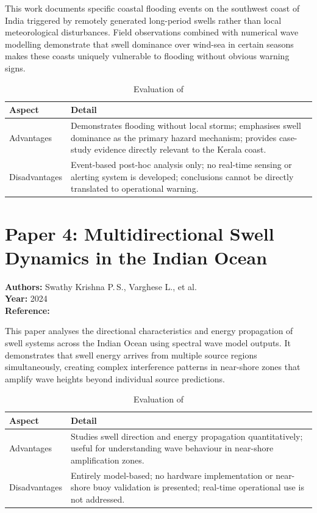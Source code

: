 This work documents specific coastal flooding events on the southwest coast of India
triggered by remotely generated long-period swells rather than local meteorological
disturbances.
Field observations combined with numerical wave modelling demonstrate that swell
dominance over wind-sea in certain seasons makes these coasts uniquely vulnerable to
flooding without obvious warning signs.

\begin{table}[H]
\centering
\caption{Evaluation of \cite{nair2018coastal}}
\label{tab:paper3}
\begin{tabularx}{\textwidth}{lX}
\toprule
\textbf{Aspect} & \textbf{Detail} \\
\midrule
Advantages &
  Demonstrates flooding without local storms;
  emphasises swell dominance as the primary hazard mechanism;
  provides case-study evidence directly relevant to the Kerala coast. \\
\addlinespace
Disadvantages &
  Event-based post-hoc analysis only;
  no real-time sensing or alerting system is developed;
  conclusions cannot be directly translated to operational warning. \\
\bottomrule
\end{tabularx}
\end{table}

\section{Paper 4: Multidirectional Swell Dynamics in the Indian Ocean}

\textbf{Authors:} Swathy Krishna P.\,S., Varghese L., et al.\\
\textbf{Year:} 2024\\
\textbf{Reference:} \cite{swathy2024multidirectional}

This paper analyses the directional characteristics and energy propagation of swell
systems across the Indian Ocean using spectral wave model outputs.
It demonstrates that swell energy arrives from multiple source regions simultaneously,
creating complex interference patterns in near-shore zones that amplify wave heights
beyond individual source predictions.

\begin{table}[H]
\centering
\caption{Evaluation of \cite{swathy2024multidirectional}}
\label{tab:paper4}
\begin{tabularx}{\textwidth}{lX}
\toprule
\textbf{Aspect} & \textbf{Detail} \\
\midrule
Advantages &
  Studies swell direction and energy propagation quantitatively;
  useful for understanding wave behaviour in near-shore amplification zones. \\
\addlinespace
Disadvantages &
  Entirely model-based;
  no hardware implementation or near-shore buoy validation is presented;
  real-time operational use is not addressed. \\
\bottomrule
\end{tabularx}
\end{table}

